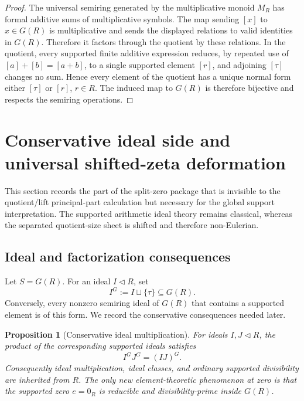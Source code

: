 \documentclass[11pt]{article}
\theoremstyle{plain}
\newtheorem{proposition}[theorem]{Proposition}
\theoremstyle{definition}
\numberwithin{equation}{section}
\begin{document}
\begin{proof}
The universal semiring generated by the multiplicative monoid \(M_R\) has formal additive sums of multiplicative symbols.  The map sending \([x]\) to \(x\in G(R)\) is multiplicative and sends the displayed relations to valid identities in \(G(R)\).  Therefore it factors through the quotient by these relations.  In the quotient, every supported finite additive expression reduces, by repeated use of \([a]+[b]=[a+b]\), to a single supported element \([r]\), and adjoining \([\tau]\) changes no sum.  Hence every element of the quotient has a unique normal form either \([\tau]\) or \([r]\), \(r\in R\).  The induced map to \(G(R)\) is therefore bijective and respects the semiring operations.
\end{proof}


\section{Conservative ideal side and universal shifted-zeta deformation}\label{sec:zeta-flow}

This section records the part of the split-zero package that is invisible to the quotient/lift principal-part calculation but necessary for the global support interpretation.  The supported arithmetic ideal theory remains classical, whereas the separated quotient-size sheet is shifted and therefore non-Eulerian.

\subsection{Ideal and factorization consequences}

Let \(S=G(R)\).  For an ideal \(I\lhd R\), set
\[
 I^G:=I\sqcup\{\tau\}\subseteq G(R).
\]
Conversely, every nonzero semiring ideal of \(G(R)\) that contains a supported element is of this form.  We record the conservative consequences needed later.

\begin{proposition}[Conservative ideal multiplication]\label{prop:ideal-mult}
For ideals \(I,J\lhd R\), the product of the corresponding supported ideals satisfies
\[
 I^GJ^G=(IJ)^G.
\]
Consequently ideal multiplication, ideal classes, and ordinary supported divisibility are inherited from \(R\).  The only new element-theoretic phenomenon at zero is that the supported zero \(e=0_R\) is reducible and divisibility-prime inside \(G(R)\).
\end{proposition}
\end{document}
